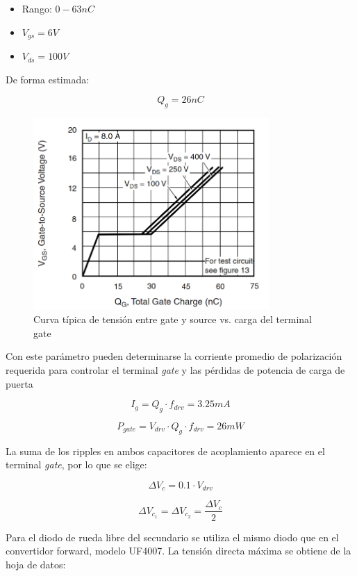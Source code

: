 \begin{itemize}
    \item Rango: $0-63nC$
    \item $V_{gs}=6V$
    \item $V_{ds}=100V$
\end{itemize}

De forma estimada: 

$$ Q_g=26nC $$

\begin{figure}[ht]
    \centering
    \includegraphics[width=0.8\textwidth]{images/irf840/vgs-vs-qg.png}
    \caption{Curva típica de tensión entre gate y source vs. carga del terminal gate}
    \label{fig:vgs-vs-qg}
\end{figure}

Con este parámetro pueden determinarse la corriente promedio de polarización requerida para controlar el terminal \textit{gate} 
y las pérdidas de potencia de carga de puerta

$$ I_g=Q_g\cdot f_{drv}=3.25mA $$

$$ P_{gate}=V_{drv}\cdot Q_g\cdot f_{drv}=26mW $$


La suma de los ripples en ambos capacitores de acoplamiento aparece en el terminal \textit{gate},
por lo que se elige:

$$ \Delta V_c=0.1\cdot V_{drv} $$

$$ \Delta V_{c_1}=\Delta V_{c_2}=\frac{\Delta V_c}{2} $$

Para el diodo de rueda libre del secundario se utiliza el mismo diodo que en el convertidor forward, modelo UF4007. 
La tensión directa máxima se obtiene de la hoja de datos: 

